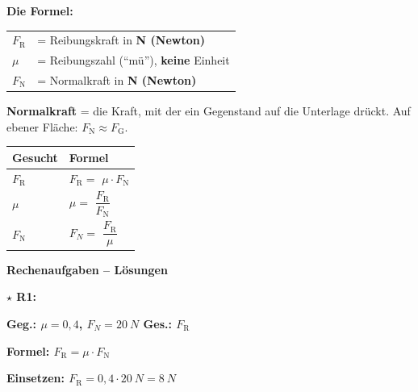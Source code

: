 \documentclass[11pt,a4paper]{article}
\newcommand{\aufgabe}[1]{\noindent\textbf{\textcolor{fachfarbe}{#1}}}
\newcommand{\lsg}[1]{\textcolor{loesung}{\textbf{#1}}}
\newcommand{\stern}[1]{\textcolor{merkerand}{\textbf{#1}}}
\begin{document}
\begin{merkebox}[title=K3: Die Reibungsformel \stern{$\star\star$}]
\small
\textbf{Die Formel:} 

\vspace{0.3em}
\renewcommand{\arraystretch}{1.2}
\begin{tabular}{ll}
$F_\text{R}$ & = Reibungskraft in \lsg{N (Newton)} \\
$\mu$ & = Reibungszahl (``mü''), \lsg{keine} Einheit \\
$F_\text{N}$ & = Normalkraft in \lsg{N (Newton)} \\
\end{tabular}

\vspace{0.2em}
{\small\textbf{Normalkraft} = die Kraft, mit der ein Gegenstand auf die Unterlage drückt. Auf ebener Fläche: $F_\text{N} \approx F_\text{G}$.}

\vspace{0.3em}
\renewcommand{\arraystretch}{1.5}
\begin{tabular}{|p{2cm}|p{6cm}|}
\hline
\textbf{Gesucht} & \textbf{Formel} \\
\hline
$F_\text{R}$ & $F_\text{R} =$ \lsg{$\mu \cdot F_\text{N}$} \\
\hline
$\mu$ & $\mu =$ \lsg{$\dfrac{F_\text{R}}{F_\text{N}}$} \\
\hline
$F_\text{N}$ & $F_N =$ \lsg{$\dfrac{F_\text{R}}{\mu}$} \\
\hline
\end{tabular}
\end{merkebox}

\vspace{0.4em}

\aufgabe{Rechenaufgaben -- Lösungen}

\vspace{0.3em}
\textbf{\stern{$\star$} R1:}

\lsg{Geg.: $\mu = 0{,}4$, $F_N = \SI{20}{N}$ \quad Ges.: $F_\text{R}$}

\lsg{Formel: $F_\text{R} = \mu \cdot F_\text{N}$}

\lsg{Einsetzen: $F_\text{R} = 0{,}4 \cdot \SI{20}{N} = \SI{8}{N}$}
\end{document}
